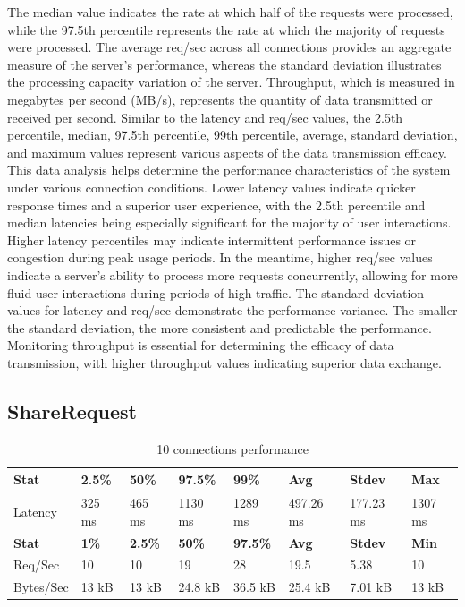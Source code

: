 \documentclass[../Main.tex]{subfiles}
\begin{document}
\indent The median value indicates the rate at which half of the requests were processed, while the 97.5th percentile represents the rate at which the majority of requests were processed. The average req/sec across all connections provides an aggregate measure of the server's performance, whereas the standard deviation illustrates the processing capacity variation of the server. Throughput, which is measured in megabytes per second (MB/s), represents the quantity of data transmitted or received per second. Similar to the latency and req/sec values, the 2.5th percentile, median, 97.5th percentile, 99th percentile, average, standard deviation, and maximum values represent various aspects of the data transmission efficacy. This data analysis helps determine the performance characteristics of the system under various connection conditions. Lower latency values indicate quicker response times and a superior user experience, with the 2.5th percentile and median latencies being especially significant for the majority of user interactions. Higher latency percentiles may indicate intermittent performance issues or congestion during peak usage periods. In the meantime, higher req/sec values indicate a server's ability to process more requests concurrently, allowing for more fluid user interactions during periods of high traffic. The standard deviation values for latency and req/sec demonstrate the performance variance. The smaller the standard deviation, the more consistent and predictable the performance. Monitoring throughput is essential for determining the efficacy of data transmission, with higher throughput values indicating superior data exchange.

\begin{table}[H]
\subsection{ShareRequest}
  \centering
\begin{tabular}{|l|l|l|l|l|l|l|l|}
\hline
\rowcolor[HTML]{f56b00}
\textbf{Stat} & \textbf{2.5\%} & \textbf{50\%} & \textbf{97.5\%} & \textbf{99\%} & \textbf{Avg} & \textbf{Stdev} & \textbf{Max} \\
\hline
Latency   & 325 ms & 465 ms & 1130 ms & 1289 ms & 497.26 ms & 177.23 ms & 1307 ms \\
\hline
\rowcolor[HTML]{f56b00}
\textbf{Stat} & \textbf{1\%} & \textbf{2.5\%} & \textbf{50\%} & \textbf{97.5\%} & \textbf{Avg} & \textbf{Stdev} & \textbf{Min} \\
Req/Sec   & 10  & 10  & 19   & 28   & 19.5  & 5.38 & 10  \\
\hline
Bytes/Sec & 13 kB & 13 kB & 24.8 kB & 36.5 kB & 25.4 kB & 7.01 kB & 13 kB \\
\hline
\end{tabular}
 \caption{10 connections performance}
 \label{10-connections-performance}
\end{table}
\end{document}
